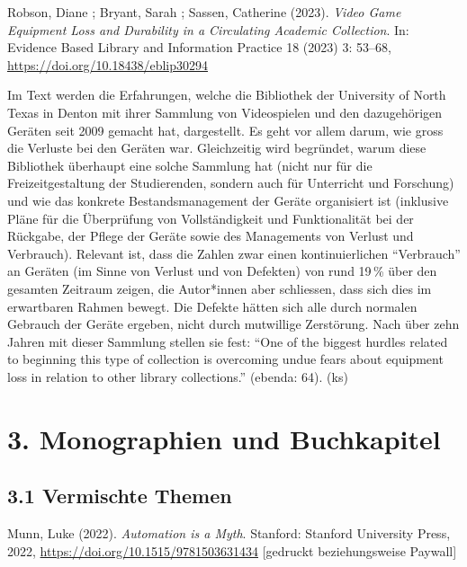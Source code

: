 \documentclass[a4paper,
fontsize=11pt,
oneside,
numbers=noperiodatend,
parskip=half-,
bibliography=totoc,
final
]{scrartcl}
\begin{document}
Robson, Diane ; Bryant, Sarah ; Sassen, Catherine (2023). \emph{Video
Game Equipment Loss and Durability in a Circulating Academic
Collection}. In: Evidence Based Library and Information Practice 18
(2023) 3: 53--68, \url{https://doi.org/10.18438/eblip30294}

Im Text werden die Erfahrungen, welche die Bibliothek der University of
North Texas in Denton mit ihrer Sammlung von Videospielen und den
dazugehörigen Geräten seit 2009 gemacht hat, dargestellt. Es geht vor
allem darum, wie gross die Verluste bei den Geräten war. Gleichzeitig
wird begründet, warum diese Bibliothek überhaupt eine solche Sammlung
hat (nicht nur für die Freizeitgestaltung der Studierenden, sondern auch
für Unterricht und Forschung) und wie das konkrete Bestandsmanagement
der Geräte organisiert ist (inklusive Pläne für die Überprüfung von
Vollständigkeit und Funktionalität bei der Rückgabe, der Pflege der
Geräte sowie des Managements von Verlust und Verbrauch). Relevant ist,
dass die Zahlen zwar einen kontinuierlichen \enquote{Verbrauch} an
Geräten (im Sinne von Verlust und von Defekten) von rund 19\,\% über den
gesamten Zeitraum zeigen, die Autor*innen aber schliessen, dass sich
dies im erwartbaren Rahmen bewegt. Die Defekte hätten sich alle durch
normalen Gebrauch der Geräte ergeben, nicht durch mutwillige Zerstörung.
Nach über zehn Jahren mit dieser Sammlung stellen sie fest: \enquote{One
of the biggest hurdles related to beginning this type of collection is
overcoming undue fears about equipment loss in relation to other library
collections.} (ebenda: 64). (ks)

\hypertarget{monographien-und-buchkapitel}{%
\section{3. Monographien und
Buchkapitel}\label{monographien-und-buchkapitel}}

\hypertarget{vermischte-themen-1}{%
\subsection{3.1 Vermischte Themen}\label{vermischte-themen-1}}

Munn, Luke (2022). \emph{Automation is a Myth}. Stanford: Stanford
University Press, 2022, \url{https://doi.org/10.1515/9781503631434}
{[}gedruckt beziehungsweise Paywall{]}
\end{document}
